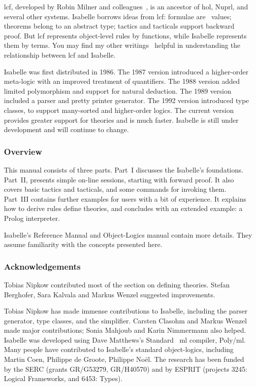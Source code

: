 \documentclass[12pt]{article}
\begin{document}
{\sc lcf}, developed by Robin Milner and colleagues~\cite{mgordon79}, is an
ancestor of {\sc hol}, Nuprl, and several other systems.  Isabelle borrows
ideas from {\sc lcf}: formulae are~\ML{} values; theorems belong to an
abstract type; tactics and tacticals support backward proof.  But {\sc lcf}
represents object-level rules by functions, while Isabelle represents them
by terms.  You may find my other writings~\cite{paulson87,paulson-handbook}
helpful in understanding the relationship between {\sc lcf} and Isabelle.

 Isabelle was first distributed in 1986.
The 1987 version introduced a higher-order meta-logic with an improved
treatment of quantifiers.  The 1988 version added limited polymorphism and
support for natural deduction.  The 1989 version included a parser and
pretty printer generator.  The 1992 version introduced type classes, to
support many-sorted and higher-order logics.  The current version provides
greater support for theories and is much faster.  Isabelle is still under
development and will continue to change.

\subsubsection*{Overview} 
This manual consists of three parts.  Part~I discusses the Isabelle's
foundations.  Part~II, presents simple on-line sessions, starting with
forward proof.  It also covers basic tactics and tacticals, and some
commands for invoking them.  Part~III contains further examples for users
with a bit of experience.  It explains how to derive rules define theories,
and concludes with an extended example: a Prolog interpreter.

Isabelle's Reference Manual and Object-Logics manual contain more details.
They assume familiarity with the concepts presented here.


\subsubsection*{Acknowledgements} 
Tobias Nipkow contributed most of the section on defining theories.
Stefan Berghofer, Sara Kalvala and Markus Wenzel suggested improvements.

Tobias Nipkow has made immense contributions to Isabelle, including the
parser generator, type classes, and the simplifier.  Carsten Clasohm and
Markus Wenzel made major contributions; Sonia Mahjoub and Karin Nimmermann
also helped.  Isabelle was developed using Dave Matthews's Standard~{\sc
  ml} compiler, Poly/{\sc ml}.  Many people have contributed to Isabelle's
standard object-logics, including Martin Coen, Philippe de Groote, Philippe
No\"el.  The research has been funded by the SERC (grants GR/G53279,
GR/H40570) and by ESPRIT (projects 3245: Logical Frameworks, and 6453:
Types).
\end{document}
